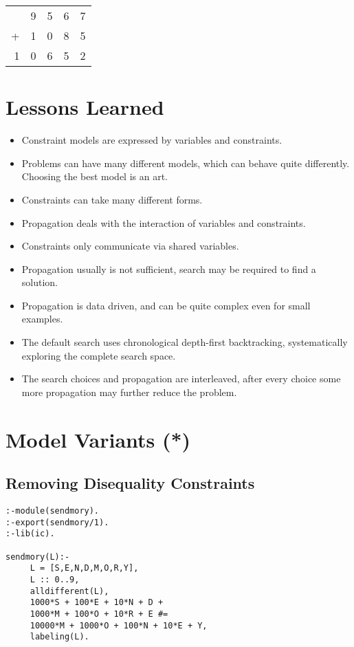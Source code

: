 \documentclass[a4paper]{article}
\begin{document}
\vspace{0.5cm}
\begin{center}
\begin{tabular}{rrrrr}
& 9 & 5 & 6 & 7 \\
+ & 1 & 0 & 8 & 5 \\ \hline
1 & 0 & 6 & 5 & 2
\end{tabular}
\end{center} 

\section{Lessons Learned}
\begin{itemize}
\item Constraint models are expressed by variables and constraints.
\item Problems can have many different models, which can behave quite differently. Choosing the best model is an art.
\item Constraints can take many different forms.
\item Propagation deals with the interaction of variables and constraints.
\item Constraints only communicate via shared variables.
\item Propagation usually is not sufficient, search may be required to find a solution.
\item Propagation is data driven, and can be quite complex even for small examples.
\item The default search uses chronological depth-first backtracking, systematically exploring the complete search space.
\item The search choices and propagation are interleaved, after every choice some more propagation may further reduce the problem.
\end{itemize}

\section{Model Variants (*)}
\subsection{Removing Disequality Constraints}
\begin{lstlisting}[float,label=sendmory1,caption=Program Sendmory without Disequality Constraints]
:-module(sendmory).
:-export(sendmory/1).
:-lib(ic).

sendmory(L):-
     L = [S,E,N,D,M,O,R,Y], 
     L :: 0..9,
     alldifferent(L),
     1000*S + 100*E + 10*N + D + 
     1000*M + 100*O + 10*R + E #= 
     10000*M + 1000*O + 100*N + 10*E + Y,
     labeling(L).
\end{lstlisting}
\end{document}
